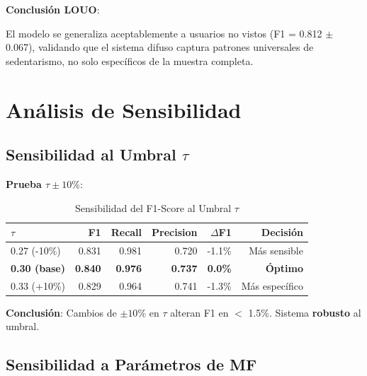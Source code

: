 \documentclass[12pt,letterpaper,twoside]{report}
\begin{document}
\begin{decisionbox}
\textbf{Conclusión LOUO}:

El modelo se generaliza aceptablemente a usuarios no vistos (F1 = 0.812 $\pm$ 0.067), validando que el sistema difuso captura patrones universales de sedentarismo, no solo específicos de la muestra completa.
\end{decisionbox}

\section{Análisis de Sensibilidad}

\subsection{Sensibilidad al Umbral $\tau$}

\begin{calculobox}
\textbf{Prueba $\tau \pm 10\%$}:

\begin{table}[H]
\centering
\caption{Sensibilidad del F1-Score al Umbral $\tau$}
\label{tab:tau_sensitivity}
\begin{tabular}{@{}lrrrrr@{}}
\toprule
\textbf{$\tau$} & \textbf{F1} & \textbf{Recall} & \textbf{Precision} & \textbf{$\Delta$F1} & \textbf{Decisión} \\
\midrule
0.27 (-10\%) & 0.831 & 0.981 & 0.720 & -1.1\% & Más sensible \\
\textbf{0.30 (base)} & \textbf{0.840} & \textbf{0.976} & \textbf{0.737} & \textbf{0.0\%} & \textbf{Óptimo} \\
0.33 (+10\%) & 0.829 & 0.964 & 0.741 & -1.3\% & Más específico \\
\bottomrule
\end{tabular}
\end{table}

\textbf{Conclusión}: Cambios de $\pm 10\%$ en $\tau$ alteran F1 en $<$ 1.5\%. Sistema \textbf{robusto} al umbral.
\end{calculobox}

\subsection{Sensibilidad a Parámetros de MF}
\end{document}
